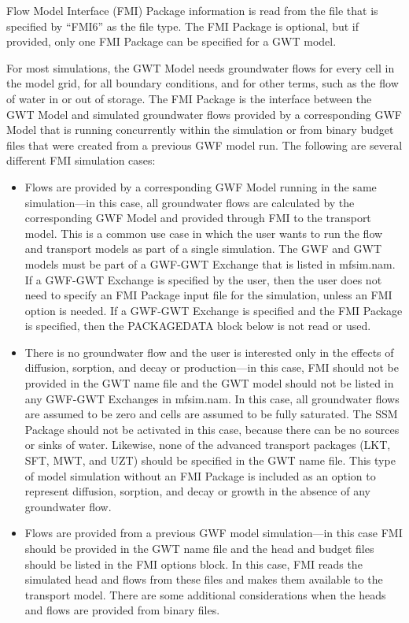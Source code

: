 Flow Model Interface (FMI) Package information is read from the file that is specified by ``FMI6'' as the file type.  The FMI Package is optional, but if provided, only one FMI Package can be specified for a GWT model.

For most simulations, the GWT Model needs groundwater flows for every cell in the model grid, for all boundary conditions, and for other terms, such as the flow of water in or out of storage.  The FMI Package is the interface between the GWT Model and simulated groundwater flows provided by a corresponding GWF Model that is running concurrently within the simulation or from binary budget files that were created from a previous GWF model run.  The following are several different FMI simulation cases:

\begin{itemize}

\item Flows are provided by a corresponding GWF Model running in the same simulation---in this case, all groundwater flows are calculated by the corresponding GWF Model and provided through FMI to the transport model.  This is a common use case in which the user wants to run the flow and transport models as part of a single simulation.  The GWF and GWT models must be part of a GWF-GWT Exchange that is listed in mfsim.nam.  If a GWF-GWT Exchange is specified by the user, then the user does not need to specify an FMI Package input file for the simulation, unless an FMI option is needed.  If a GWF-GWT Exchange is specified and the FMI Package is specified, then the PACKAGEDATA block below is not read or used.

\item There is no groundwater flow and the user is interested only in the effects of diffusion, sorption, and decay or production---in this case, FMI should not be provided in the GWT name file and the GWT model should not be listed in any GWF-GWT Exchanges in mfsim.nam.  In this case, all groundwater flows are assumed to be zero and cells are assumed to be fully saturated.  The SSM Package should not be activated in this case, because there can be no sources or sinks of water.  Likewise, none of the advanced transport packages (LKT, SFT, MWT, and UZT) should be specified in the GWT name file.  This type of model simulation without an FMI Package is included as an option to represent diffusion, sorption, and decay or growth in the absence of any groundwater flow.

\item Flows are provided from a previous GWF model simulation---in this case FMI should be provided in the GWT name file and the head and budget files should be listed in the FMI options block.  In this case, FMI reads the simulated head and flows from these files and makes them available to the transport model.  There are some additional considerations when the heads and flows are provided from binary files.


\end{itemize}
